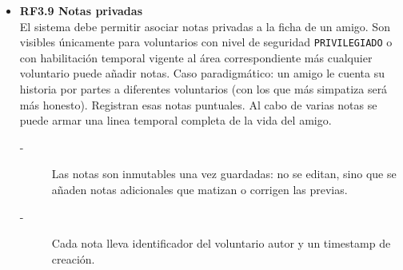 \begin{itemize}
    \item \textbf{RF3.9 Notas privadas} \\
    El sistema debe permitir asociar notas privadas a la ficha de un amigo. Son
    visibles únicamente para voluntarios con nivel de seguridad \texttt{PRIVILEGIADO} o
    con habilitación temporal vigente al área correspondiente más cualquier voluntario puede añadir notas. 
    Caso paradigmático: un amigo le cuenta su historia por partes a diferentes voluntarios (con los que más simpatiza será más honesto). Registran esas notas puntuales. 
    Al cabo de varias notas se puede armar una linea temporal completa de la vida del amigo.
    \begin{description}
        \item[-] Las notas son inmutables una vez guardadas: no se editan, sino que se
        añaden notas adicionales que matizan o corrigen las previas.
        \item[-] Cada nota lleva identificador del voluntario autor y un timestamp de creación.
    \end{description}
\end{itemize}




